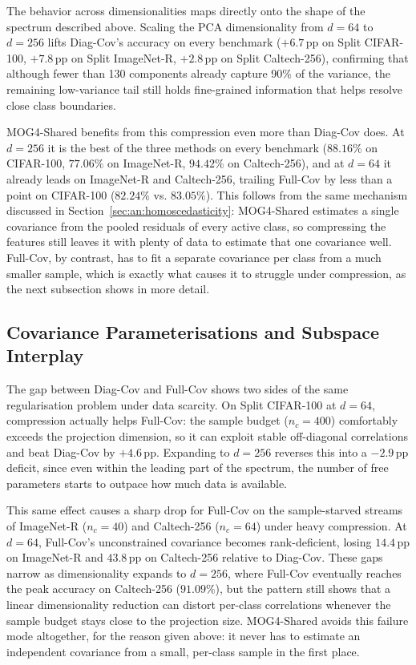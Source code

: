 The behavior across dimensionalities maps directly onto the shape of the spectrum described above. Scaling the PCA dimensionality from $d=64$ to $d=256$ lifts Diag-Cov's accuracy on every benchmark ($+6.7$\,pp on Split CIFAR-100, $+7.8$\,pp on Split ImageNet-R, $+2.8$\,pp on Split Caltech-256), confirming that although fewer than 130 components already capture 90\% of the variance, the remaining low-variance tail still holds fine-grained information that helps resolve close class boundaries.

MOG4-Shared benefits from this compression even more than Diag-Cov does. At $d=256$ it is the best of the three methods on every benchmark ($88.16\%$ on CIFAR-100, $77.06\%$ on ImageNet-R, $94.42\%$ on Caltech-256), and at $d=64$ it already leads on ImageNet-R and Caltech-256, trailing Full-Cov by less than a point on CIFAR-100 ($82.24\%$ vs. $83.05\%$). This follows from the same mechanism discussed in Section~\ref{sec:an:homoscedasticity}: MOG4-Shared estimates a single covariance from the pooled residuals of every active class, so compressing the features still leaves it with plenty of data to estimate that one covariance well. Full-Cov, by contrast, has to fit a separate covariance per class from a much smaller sample, which is exactly what causes it to struggle under compression, as the next subsection shows in more detail.

\subsection{Covariance Parameterisations and Subspace Interplay}
\label{sec:pca_covariance_interplay}

The gap between Diag-Cov and Full-Cov shows two sides of the same regularisation problem under data scarcity. On Split CIFAR-100 at $d=64$, compression actually helps Full-Cov: the sample budget ($n_c=400$) comfortably exceeds the projection dimension, so it can exploit stable off-diagonal correlations and beat Diag-Cov by $+4.6$\,pp. Expanding to $d=256$ reverses this into a $-2.9$\,pp deficit, since even within the leading part of the spectrum, the number of free parameters starts to outpace how much data is available.

This same effect causes a sharp drop for Full-Cov on the sample-starved streams of ImageNet-R ($n_c=40$) and Caltech-256 ($n_c=64$) under heavy compression. At $d=64$, Full-Cov's unconstrained covariance becomes rank-deficient, losing $14.4$\,pp on ImageNet-R and $43.8$\,pp on Caltech-256 relative to Diag-Cov. These gaps narrow as dimensionality expands to $d=256$, where Full-Cov eventually reaches the peak accuracy on Caltech-256 ($91.09\%$), but the pattern still shows that a linear dimensionality reduction can distort per-class correlations whenever the sample budget stays close to the projection size. MOG4-Shared avoids this failure mode altogether, for the reason given above: it never has to estimate an independent covariance from a small, per-class sample in the first place.

